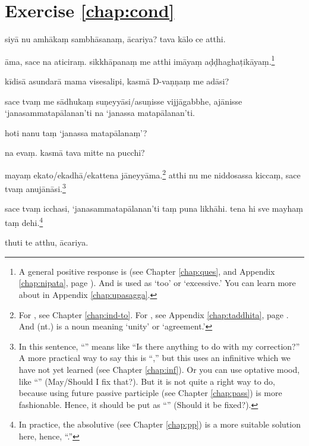 \section*{Exercise \ref{chap:cond}}
\begin{answerkey}
\item siy\=a nu amh\=aka\d m sambh\=asana\d m, \=acariya? tava k\=alo ce atthi.
\item \=ama, sace na aticira\d m. sikkh\=apana\d m me atthi im\=aya\d m a\d d\d dhagha\d tik\=aya\d m.\footnote{A general positive response is  (see Chapter \ref{chap:ques}, and Appendix \ref{chap:nipata}, page \pageref{nip:aama}). And  is used as `too' or `excessive.' You can learn more about  in Appendix \ref{chap:upasagga}.}
\item k\=idis\=a asundar\=a mama visesalipi, kasm\=a D-va\d n\d na\d m me ad\=asi?
\item sace tva\d m me s\=adhuka\d m su\d neyy\=asi/asu\d nisse vijj\=agabbhe, aj\=anisse `janasammatap\=alanan'ti na `janassa matap\=alanan'ti.
\item hoti nanu ta\d m `janassa matap\=alana\d m'?
\item na eva\d m. kasm\=a tava mitte na pucchi?
\item maya\d m ekato/ekadh\=a/ekattena j\=aneyy\=ama.\footnote{For , see Chapter \ref{chap:ind-to}. For , see Appendix \ref{chap:taddhita}, page \pageref{pacct13:dhaa}. And  (nt.) is a noun meaning `unity' or `agreement.'} atthi nu me niddosassa kicca\d m, sace tva\d m anuj\=an\=asi.\footnote{In this sentence, ``'' means like ``Is there anything to do with my correction?'' A more practical way to say this is ``,'' but this uses an infinitive which we have not yet learned (see Chapter \ref{chap:inf}). Or you can use optative mood, like ``'' (May/Should I fix that?). But it is not quite a right way to do, because using future passive participle (see Chapter \ref{chap:pass}) is more fashionable. Hence, it should be put as ``'' (Should it be fixed?).}
\item sace tva\d m icchasi, `janasammatap\=alanan'ti ta\d m puna likh\=ahi. tena hi sve mayha\d m ta\d m dehi.\footnote{In practice, the absolutive (see Chapter \ref{chap:pp}) is a more suitable solution here, hence, ``.''}
\item thuti te atthu, \=acariya.
\end{answerkey}

